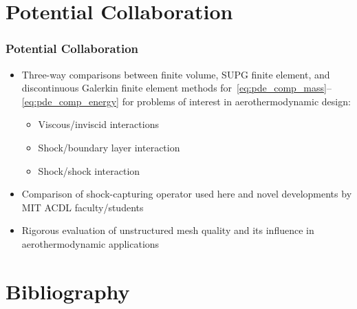 \documentclass[compress,11pt]{beamer}
\begin{document}
\section*{Potential Collaboration}
\frame
{
  \frametitle{\scriptsize Potential Collaboration}
  \begin{itemize}
    \item Three-way comparisons between finite volume, SUPG finite element, and discontinuous Galerkin finite element methods for~\eqref{eq:pde_comp_mass}--\eqref{eq:pde_comp_energy} for problems of interest in aerothermodynamic design:
      \begin{itemize}
	\item Viscous/inviscid interactions
	\item Shock/boundary layer interaction
	\item Shock/shock interaction
      \end{itemize}
      \item Comparison of shock-capturing operator used here and novel developments by MIT ACDL faculty/students
      \item Rigorous evaluation of unstructured mesh quality and its influence in aerothermodynamic applications
  \end{itemize}
}

\section{Bibliography}
\begin{frame}[allowframebreaks]{}
  
  \vspace{-1em}
  \tiny
  
  \normalsize
\end{frame}
\end{document}
